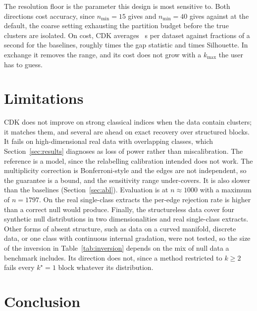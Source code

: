 \documentclass[runningheads]{llncs}
\begin{document}
The resolution floor is the parameter this design is most sensitive to. Both
directions cost accuracy, since $n_{\min}=15$ gives \nABLnminonefiveMAE{} and
$n_{\min}=40$ gives \nABLnminfourzeroMAE{} against \nCDKMAEabl{} at the
default, the coarse setting exhausting the partition budget before the true
clusters are isolated. On cost, CDK averages \nCDKTIME{}~s per dataset against
fractions of a second for the baselines, roughly \nRATIOGAP{} times the gap
statistic and \nRATIOSIL{} times Silhouette. In exchange it removes the range,
and its cost does not grow with a $k_{\max}$ the user has to guess.

\section{Limitations}
\label{sec:limits}

CDK does not improve on strong classical indices when the data contain
clusters; it matches them, and several are ahead on exact recovery over
structured blocks. It fails on high-dimensional real data with overlapping
classes, which Section~\ref{sec:results} diagnoses as loss of power rather
than miscalibration. The reference is a model, since the relabelling
calibration intended does not work. The multiplicity correction is
Bonferroni-style and the edges are not independent, so the guarantee is a
bound, and the sensitivity range under-covers. It is also slower than the baselines
(Section~\ref{sec:abl}). Evaluation is at
$n \approx 1000$ with a maximum of $n = 1797$. On the real single-class
extracts the per-edge rejection rate is higher than a correct null would
produce. Finally, the structureless data cover four synthetic null
distributions in two dimensionalities and \nNREALNULL{} real single-class
extracts. Other forms of absent structure, such as data on a curved manifold,
discrete data, or one class with continuous internal gradation, were not
tested, so the size of the inversion in Table~\ref{tab:inversion} depends on
the mix of null data a benchmark includes. Its direction does not, since a
method restricted to $k \ge 2$ fails every $k^\star = 1$ block whatever its
distribution.

\section{Conclusion}
\end{document}
